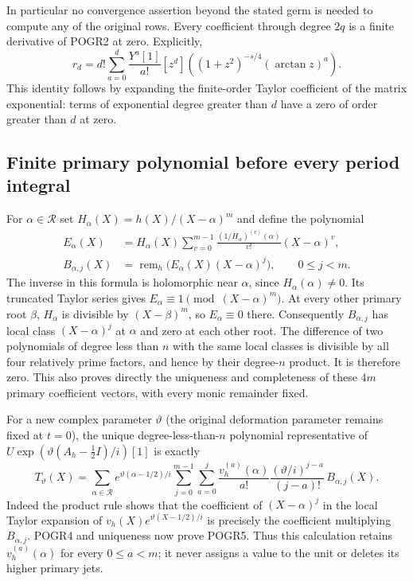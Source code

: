 In particular no convergence assertion beyond the stated germ is
needed to compute any of the original rows. Every coefficient through
degree $2q$ is a finite derivative of POGR2 at zero. Explicitly,
\[
 r_d=d!\sum_{a=0}^d\frac{Y^a[1]}{a!}
 [z^d]\left((1+z^2)^{-s/4}(\arctan z)^a\right).
 \tag{POGR3}
\]
This identity follows by expanding the finite-order Taylor coefficient
of the matrix exponential: terms of exponential degree greater than
$d$ have a zero of order greater than $d$ at zero.

\subsection{Finite primary polynomial before every period integral}
For $\alpha\in\mathcal R$ set
$H_\alpha(X)=h(X)/(X-\alpha)^m$ and define the polynomial
\[
 \begin{split}
 E_\alpha(X)&=H_\alpha(X)
  \sum_{v=0}^{m-1}\frac{(1/H_\alpha)^{(v)}(\alpha)}{v!}
                  (X-\alpha)^v,\\
 B_{\alpha,j}(X)&=\operatorname{rem}_h
                         \bigl(E_\alpha(X)(X-\alpha)^j\bigr),
                         \qquad 0\leq j<m.
 \end{split}\tag{POGR4}
\]
The inverse in this formula is holomorphic near $\alpha$, since
$H_\alpha(\alpha)\ne0$. Its truncated Taylor series gives
$E_\alpha\equiv1\pmod{(X-\alpha)^m}$. At every other primary root
$\beta$, $H_\alpha$ is divisible by $(X-\beta)^m$, so
$E_\alpha\equiv0$ there. Consequently $B_{\alpha,j}$ has local
class $(X-\alpha)^j$ at $\alpha$ and zero at each other root.
The difference of two polynomials of degree less than $n$ with the
same local classes is divisible by all four relatively prime factors,
and hence by their degree-$n$ product. It is therefore zero. This
also proves directly the uniqueness and completeness of these
$4m$ primary coefficient vectors, with every monic remainder fixed.

For a new complex parameter $\vartheta$ (the original deformation
parameter remains fixed at $t=0$), the unique degree-less-than-$n$
polynomial representative of
$U\exp(\vartheta(A_h-\tfrac12 I)/i)[1]$ is exactly
\[
 T_\vartheta(X)=\sum_{\alpha\in\mathcal R}
 e^{\vartheta(\alpha-1/2)/i}
 \sum_{j=0}^{m-1}\sum_{a=0}^{j}
 \frac{v_h^{(a)}(\alpha)}{a!}
 \frac{(\vartheta/i)^{j-a}}{(j-a)!}\,B_{\alpha,j}(X).
 \tag{POGR5}
\]
Indeed the product rule shows that the coefficient of
$(X-\alpha)^j$ in the local Taylor expansion of
$v_h(X)e^{\vartheta(X-1/2)/i}$ is precisely the coefficient multiplying
$B_{\alpha,j}$. POGR4 and uniqueness now prove POGR5. Thus this
calculation retains $v_h^{(a)}(\alpha)$ for every $0\leq a<m$;
it never assigns a value to the unit or deletes its higher primary jets.

